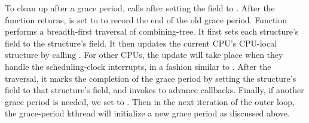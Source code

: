To clean up after a grace period,  
calls  after setting the  field  
to . After the function returns,  is set to 
 to record the end of the old grace period.
%
Function  performs a breadth-first traversal of
 combining-tree.
It first sets each  structure's  field
to the  structure's  field.
It then updates the current CPU's CPU-local  structure by
calling . 
For other CPUs, the update will take place when they handle the scheduling-clock
interrupts, in a fashion similar to . 
After the traversal, it marks the completion of the grace period by setting the
 structure's 
field to that structure's  field, and invokes
 to advance callbacks. 
%
Finally, if another grace period is needed,
we set  to . 
Then in the next iteration of the outer loop, the grace-period kthread
will initialize a new grace period as discussed above.




